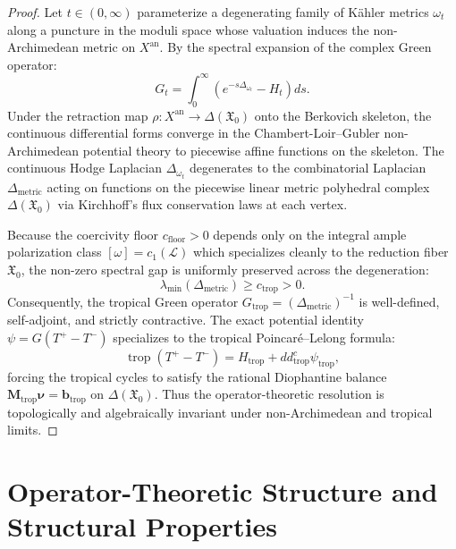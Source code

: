 \documentclass[11pt,a4paper]{article}
\theoremstyle{definition}
\theoremstyle{plain}
\begin{document}
\begin{proof}
Let $t \in (0, \infty)$ parameterize a degenerating family of Kähler metrics $\omega_t$ along a puncture in the moduli space whose valuation induces the non-Archimedean metric on $X^{\mathrm{an}}$. By the spectral expansion of the complex Green operator:
\begin{equation}
    G_t = \int_0^\infty \left( e^{-s \Delta_{\omega_t}} - H_t \right) ds.
\end{equation}
Under the retraction map $\rho: X^{\mathrm{an}} \to \Delta(\mathfrak{X}_0)$ onto the Berkovich skeleton, the continuous differential forms converge in the Chambert-Loir--Gubler non-Archimedean potential theory to piecewise affine functions on the skeleton. The continuous Hodge Laplacian $\Delta_{\omega_t}$ degenerates to the combinatorial Laplacian $\Delta_{\mathrm{metric}}$ acting on functions on the piecewise linear metric polyhedral complex $\Delta(\mathfrak{X}_0)$ via Kirchhoff's flux conservation laws at each vertex.

Because the coercivity floor $c_{\mathrm{floor}} > 0$ depends only on the integral ample polarization class $[\omega] = c_1(\mathcal{L})$ which specializes cleanly to the reduction fiber $\mathfrak{X}_0$, the non-zero spectral gap is uniformly preserved across the degeneration:
\begin{equation}
    \lambda_{\min}(\Delta_{\mathrm{metric}}) \ge c_{\mathrm{trop}} > 0.
\end{equation}
Consequently, the tropical Green operator $G_{\mathrm{trop}} = (\Delta_{\mathrm{metric}})^{-1}$ is well-defined, self-adjoint, and strictly contractive. The exact potential identity $\psi = G(T^+ - T^-)$ specializes to the tropical Poincaré--Lelong formula:
\begin{equation}
    \operatorname{trop}(T^+ - T^-) = H_{\mathrm{trop}} + dd^c_{\mathrm{trop}} \psi_{\mathrm{trop}},
\end{equation}
forcing the tropical cycles to satisfy the rational Diophantine balance $\mathbf{M}_{\mathrm{trop}} \boldsymbol{\nu} = \mathbf{b}_{\mathrm{trop}}$ on $\Delta(\mathfrak{X}_0)$. Thus the operator-theoretic resolution is topologically and algebraically invariant under non-Archimedean and tropical limits.
\end{proof}

\section{Operator-Theoretic Structure and Structural Properties}
\label{sec:cross_framework_synthesis}
\end{document}
